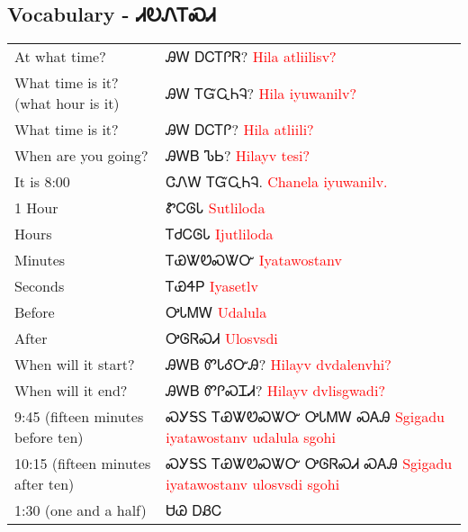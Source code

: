 \subsection{Vocabulary - ᏗᎧᏁᎢᏍᏗ 
}
\begin{tabular}{p{3cm} p{11cm}}
At what time? & ᎯᎳ ᎠᏟᎢᎵᏒ? 
 \newline \textcolor{red}{Hila atliilisv?}\\
What time is it? (what hour is it) & ᎯᎳ ᎢᏳᏩᏂᎸ? 
 \newline \textcolor{red}{Hila iyuwanilv?}\\
What time is it? & ᎯᎳ ᎠᏟᎢᎵ? 
 \newline \textcolor{red}{Hila atliili?}\\
When are you going? & ᎯᎳᏴ ᏖᏏ? 
 \newline \textcolor{red}{Hilayv tesi?}\\
It is 8:00 & ᏣᏁᎳ ᎢᏳᏩᏂᎸ. 
 \newline \textcolor{red}{Chanela iyuwanilv.}\\
1 Hour & ᏑᏟᎶᏓ 
 \newline \textcolor{red}{Sutliloda}\\
Hours & ᎢᏧᏟᎶᏓ 
 \newline \textcolor{red}{Ijutliloda}\\
Minutes & ᎢᏯᏔᏬᏍᏔᏅ 
 \newline \textcolor{red}{Iyatawostanv}\\
Seconds & ᎢᏯᏎᏢ 
 \newline \textcolor{red}{Iyasetlv}\\
Before & ᎤᏓᎷᎳ 
 \newline \textcolor{red}{Udalula}\\
After & ᎤᎶᏒᏍᏗ 
 \newline \textcolor{red}{Ulosvsdi}\\
When will it start? & ᎯᎳᏴ ᏛᏓᎴᏅᎯ? 
 \newline \textcolor{red}{Hilayv dvdalenvhi?}\\
When will it end? & ᎯᎳᏴ ᏛᎵᏍᏆᏗ? 
 \newline \textcolor{red}{Hilayv dvlisgwadi?}\\
9:45 (fifteen minutes before ten) & ᏍᎩᎦᏚ ᎢᏯᏔᏬᏍᏔᏅ ᎤᏓᎷᎳ ᏍᎪᎯ 
 \newline \textcolor{red}{Sgigadu iyatawostanv udalula sgohi}\\
10:15 (fifteen minutes after ten) & ᏍᎩᎦᏚ ᎢᏯᏔᏬᏍᏔᏅ ᎤᎶᏒᏍᏗ ᏍᎪᎯ 
 \newline \textcolor{red}{Sgigadu iyatawostanv ulosvsdi sgohi}\\
1:30 (one and a half) & ᏌᏊ ᎠᏰᏟ 

\end{tabular}
